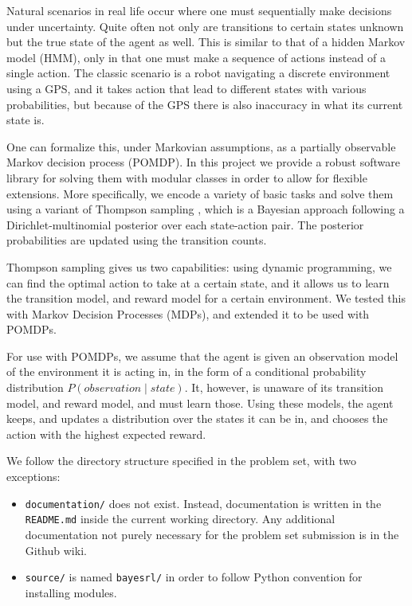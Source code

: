 \documentclass{pset}
\begin{document}

Natural scenarios in real life occur where one must sequentially make decisions
under uncertainty. Quite often not only are transitions to certain states
unknown but the true state of the agent as well. This is similar to that of a
hidden Markov model (HMM), only in that one must make a sequence of actions
instead of a single action. The classic scenario is a robot navigating a
discrete environment using a GPS, and it takes action that lead to different
states with various probabilities, but because of the GPS there is also
inaccuracy in what its current state is.

One can formalize this, under Markovian assumptions, as a partially observable
Markov decision process (POMDP). In this project we provide a robust software
library for solving them with modular classes in order to allow for flexible
extensions.  More specifically, we encode a variety of basic tasks and solve
them using a variant of Thompson sampling \cite{strens2000bayesian}, which is a Bayesian approach
following a Dirichlet-multinomial posterior over each state-action pair. The
posterior probabilities are updated using the transition counts.

Thompson sampling gives us two capabilities: using dynamic programming, we can
find the optimal action to take at a certain state, and it allows us to learn
the transition model, and reward model for a certain environment. We tested this
with Markov Decision Processes (MDPs), and extended it to be used with POMDPs.

For use with POMDPs, we assume that the agent is given an observation model of the
environment it is acting in, in the form of a conditional probability distribution
$P(observation \mid state)$. It, however, is unaware of its transition model, and
reward model, and must learn those. Using these models, the agent keeps, and
updates a distribution over the states it can be in, and chooses the action with
the highest expected reward.

We follow the directory structure specified in the problem set, with two
exceptions:
\begin{itemize}
\item \texttt{documentation/} does not exist. Instead, documentation is written
in the \texttt{README.md} inside the current working directory. Any additional
documentation not purely necessary for the problem set submission is in the
Github wiki.
\item \texttt{source/} is named \texttt{bayesrl/} in order to follow Python
convention for installing modules.
\end{itemize}
\end{document}
